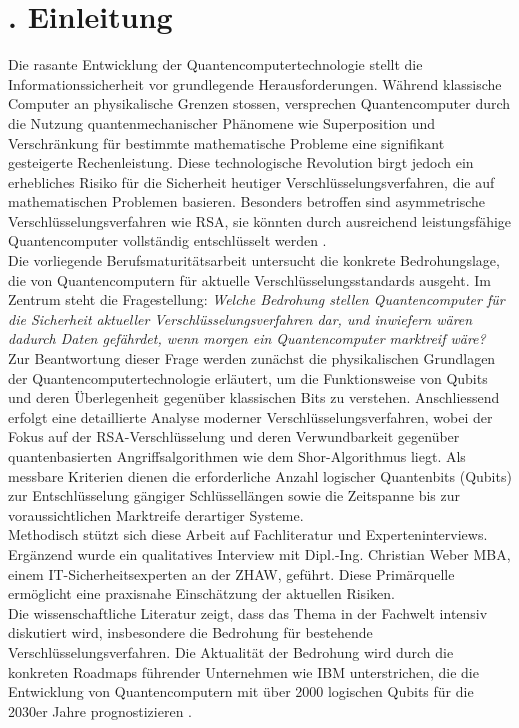
\chapter*{\thechapter. Einleitung}

Die rasante Entwicklung der Quantencomputertechnologie stellt die Informationssicherheit vor grundlegende Herausforderungen. 
Während klassische Computer an physikalische Grenzen stossen, versprechen Quantencomputer durch die Nutzung quantenmechanischer 
Phänomene wie Superposition und Verschränkung für bestimmte mathematische Probleme eine signifikant gesteigerte Rechenleistung. 
Diese technologische Revolution birgt jedoch ein erhebliches Risiko für die Sicherheit heutiger Verschlüsselungsverfahren, die auf mathematischen Problemen basieren.
Besonders betroffen sind asymmetrische Verschlüsselungsverfahren wie RSA, sie könnten durch ausreichend leistungsfähige Quantencomputer vollständig entschlüsselt werden \cite{ct2025verschluesselung}.
\\
Die vorliegende Berufsmaturitätsarbeit untersucht die konkrete Bedrohungslage, die von Quantencomputern für aktuelle Verschlüsselungsstandards ausgeht. 
Im Zentrum steht die Fragestellung: \textit{Welche Bedrohung stellen Quantencomputer für die Sicherheit aktueller Verschlüsselungsverfahren dar, und inwiefern wären dadurch Daten gefährdet, wenn morgen ein Quantencomputer marktreif wäre?}
\\
Zur Beantwortung dieser Frage werden zunächst die physikalischen Grundlagen der Quantencomputertechnologie erläutert, um die Funktionsweise von Qubits und deren Überlegenheit gegenüber klassischen Bits zu verstehen. 
Anschliessend erfolgt eine detaillierte Analyse moderner Verschlüsselungsverfahren, wobei der Fokus auf der RSA-Verschlüsselung und deren Verwundbarkeit gegenüber quantenbasierten Angriffsalgorithmen wie dem Shor-Algorithmus liegt. 
Als messbare Kriterien dienen die erforderliche Anzahl logischer Quantenbits (Qubits) zur Entschlüsselung gängiger Schlüssellängen sowie die Zeitspanne bis zur voraussichtlichen Marktreife derartiger Systeme.
\\
Methodisch stützt sich diese Arbeit auf Fachliteratur und Experteninterviews. 
Ergänzend wurde ein qualitatives Interview mit Dipl.-Ing. Christian Weber MBA, einem IT-Sicherheitsexperten an der ZHAW, geführt. 
Diese Primärquelle ermöglicht eine praxisnahe Einschätzung der aktuellen Risiken.
\\
Die wissenschaftliche Literatur zeigt, dass das Thema in der Fachwelt intensiv diskutiert wird, insbesondere die Bedrohung für bestehende Verschlüsselungsverfahren. 
Die Aktualität der Bedrohung wird durch die konkreten Roadmaps führender Unternehmen wie IBM unterstrichen, die die Entwicklung von Quantencomputern mit über 2000 logischen Qubits für die 2030er Jahre prognostizieren \cite{ct2025verschluesselung}.

